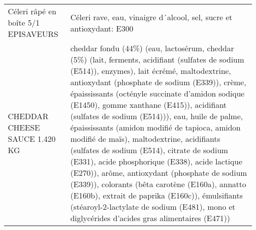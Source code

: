 \begin{longtable}{p{5cm}p{10cm}}
                                                                      Céleri râpé en boîte 5/1 EPISAVEURS &                                                                                                                                                                                                                                                                                                                                                                                                                                                                                                                                                                                                                                                                                                                                                                                                                                                                                                                                                                     Céleri rave, eau, vinaigre d´alcool, sel, sucre et antioxydant: E300 \\
                                                                            CHEDDAR CHEESE SAUCE 1.420 KG &                                                                                                                                                                                                                                cheddar fondu (44\%) (eau, lactosérum, cheddar (5\%) (lait, ferments, acidifiant (sulfates de sodium (E514)), enzymes), lait écrémé, maltodextrine, antioxydant (phosphate de sodium (E339)), crème, épaississants (octényle succinate d'amidon sodique (E1450), gomme xanthane (E415)), acidifiant (sulfates de sodium (E514))), eau, huile de palme, épaississants (amidon modifié de tapioca, amidon modifié de maïs), maltodextrine, acidifiants (sulfates de sodium (E514), citrate de sodium (E331), acide phosphorique (E338), acide lactique (E270)), arôme, antioxydant (phosphate de sodium (E339)), colorants (bêta carotène (E160a), annatto (E160b), extrait de paprika (E160c)), émulsifiants (stéaroyl-2-lactylate de sodium (E481), mono et diglycérides d'acides gras alimentaires (E471)) \\

\end{longtable}
